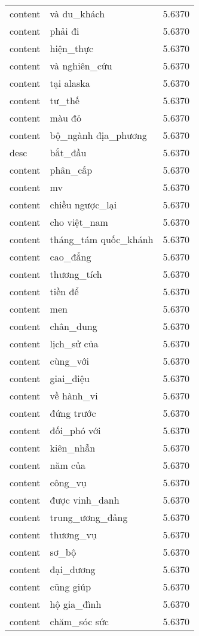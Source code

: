 \documentclass{article}
\begin{document}
\begin{tabular}{lll}
content & và du\_khách & 5.6370\\
content & phải đi & 5.6370\\
content & hiện\_thực & 5.6370\\
content & và nghiên\_cứu & 5.6370\\
content & tại alaska & 5.6370\\
content & tư\_thế & 5.6370\\
content & màu đỏ & 5.6370\\
content & bộ\_ngành địa\_phương & 5.6370\\
desc & bắt\_đầu & 5.6370\\
content & phân\_cấp & 5.6370\\
content & mv & 5.6370\\
content & chiều ngược\_lại & 5.6370\\
content & cho việt\_nam & 5.6370\\
content & tháng\_tám quốc\_khánh & 5.6370\\
content & cao\_đẳng & 5.6370\\
content & thương\_tích & 5.6370\\
content & tiền để & 5.6370\\
content & men & 5.6370\\
content & chân\_dung & 5.6370\\
content & lịch\_sử của & 5.6370\\
content & cùng\_với & 5.6370\\
content & giai\_điệu & 5.6370\\
content & về hành\_vi & 5.6370\\
content & đứng trước & 5.6370\\
content & đối\_phó với & 5.6370\\
content & kiên\_nhẫn & 5.6370\\
content & năm của & 5.6370\\
content & công\_vụ & 5.6370\\
content & được vinh\_danh & 5.6370\\
content & trung\_ương\_đảng & 5.6370\\
content & thương\_vụ & 5.6370\\
content & sơ\_bộ & 5.6370\\
content & đại\_dương & 5.6370\\
content & cũng giúp & 5.6370\\
content & hộ gia\_đình & 5.6370\\
content & chăm\_sóc sức & 5.6370\\

\end{tabular}
\end{document}
